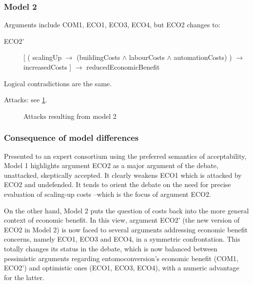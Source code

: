 \documentclass[version=3.21, pagesize, twoside=off, bibliography=totoc, DIV=calc, fontsize=12pt, a4paper, french, english]{scrartcl}
\begin{document}
\subsubsection{Model 2}
Arguments include COM1, ECO1, ECO3, ECO4, but ECO2 changes to:
\begin{description}
	\item[ECO2’] [ ( scalingUp $→$ (buildingCosts $\land$ labourCosts $\land$ automationCosts) ) $→$ increasedCosts ] $→$ reducedEconomicBenefit
\end{description}

Logical contradictions are the same.

Attacks: see \cref{fig:m2}.
\begin{figure}
	\caption{Attacks resulting from model 2}
	\label{fig:m2}
\end{figure}

\subsubsection{Consequence of model differences}
Presented to an expert consortium \citep{Insect4City2020} using the preferred semantics of acceptability, Model 1 highlights argument ECO2 as a major argument of the debate, unattacked, skeptically accepted. It clearly weakens ECO1 which is attacked by ECO2 and undefended. It tends to orient the debate on the need for precise evaluation of scaling-up costs --which is the focus of argument ECO2.

On the other hand, Model 2 puts the question of costs back into the more general context of economic benefit. In this view, argument ECO2' (the new version of ECO2 in Model 2) is now faced to several arguments addressing economic benefit concerns, namely ECO1, ECO3 and ECO4, in a symmetric confrontation. This totally changes its status in the debate, which is now balanced between pessimistic arguments regarding entomoconversion's economic benefit (COM1, ECO2') and optimistic ones  (ECO1, ECO3, ECO4), with a numeric advantage for the latter.
\end{document}
